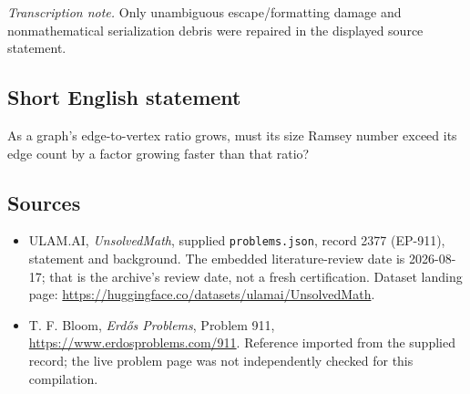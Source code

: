 \documentclass[11pt,a4paper]{article}
\begin{document}
{\small\emph{Transcription note.} Only unambiguous escape/formatting damage and nonmathematical serialization debris were repaired in the displayed source statement.}

\subsection{Short English statement}

As a graph's edge-to-vertex ratio grows, must its size Ramsey number exceed its edge count by a factor growing faster than that ratio?

\subsection{Sources}

{\small

\begin{itemize}

\item[\hypertarget{source:2377:1}{S1}] ULAM.AI, \emph{UnsolvedMath}, supplied \texttt{problems.json}, record 2377 (EP-911), statement and background. The embedded literature-review date is 2026-08-17; that is the archive’s review date, not a fresh certification. Dataset landing page: \url{https://huggingface.co/datasets/ulamai/UnsolvedMath}.

\item[\hypertarget{source:2377:2}{S2}] T. F. Bloom, \emph{Erdős Problems}, Problem 911, \url{https://www.erdosproblems.com/911}. Reference imported from the supplied record; the live problem page was not independently checked for this compilation.

\end{itemize}

}

\label{end:2377}
\end{document}
